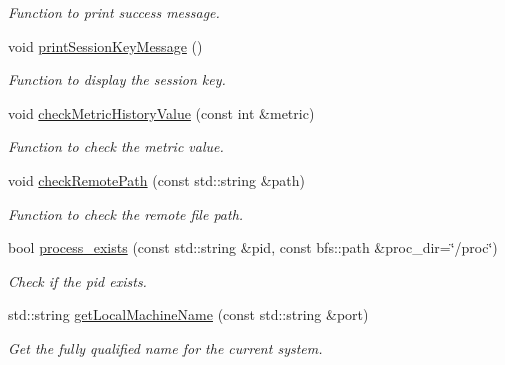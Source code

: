 \begin{DoxyCompactItemize}
\begin{DoxyCompactList}\small\item\em Function to print success message. \item\end{DoxyCompactList}\item 
\hypertarget{namespacevishnu_af872d4641cf320df3d2c2102dccbd18e}{
void \hyperlink{namespacevishnu_af872d4641cf320df3d2c2102dccbd18e}{printSessionKeyMessage} ()}
\label{namespacevishnu_af872d4641cf320df3d2c2102dccbd18e}

\begin{DoxyCompactList}\small\item\em Function to display the session key. \item\end{DoxyCompactList}\item 
void \hyperlink{namespacevishnu_a7671a1a0faa2417f4224a68879979bc4}{checkMetricHistoryValue} (const int \&metric)
\begin{DoxyCompactList}\small\item\em Function to check the metric value. \item\end{DoxyCompactList}\item 
void \hyperlink{namespacevishnu_a3b238cf04a86c821f8a267afad489bee}{checkRemotePath} (const std::string \&path)
\begin{DoxyCompactList}\small\item\em Function to check the remote file path. \item\end{DoxyCompactList}\item 
bool \hyperlink{namespacevishnu_a04f9a9dfc61b7390150222b10f64bb70}{process\_\-exists} (const std::string \&pid, const bfs::path \&proc\_\-dir=\char`\"{}/proc\char`\"{})
\begin{DoxyCompactList}\small\item\em Check if the pid exists. \item\end{DoxyCompactList}\item 
std::string \hyperlink{namespacevishnu_a7d9cd0241f290039aff6a6410b1cc22f}{getLocalMachineName} (const std::string \&port)
\begin{DoxyCompactList}\small\item\em Get the fully qualified name for the current system. \item\end{DoxyCompactList}\item 

\end{DoxyCompactItemize}
